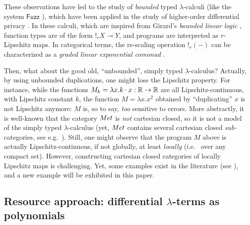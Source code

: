 These observations have led to the study of \emph{bounded} typed $\lambda$-calculi (like the system $\mathsf{Fuzz}$ \cite{Reed_2010}),
which have been applied in the study of higher-order differential privacy \cite{}. In these calculi, which are inspired from Girard's \emph{bounded linear logic} \cite{}, function types are of the form $!_{r}X \multimap Y$, and programs are interpreted as $r$-Lipschitz maps. In categorical terms, the re-scaling operation $!_{r}(-)$ can be characterized as a  \emph{graded linear exponential comonad} \cite{}. 

Then, what about the good old, ``unbounded'', simply typed $\lambda$-calculus? Actually, by using unbounded duplications, one might lose the Lipschitz property. For instance, while the functions $M_{k}=\lambda x. k\cdot x: \mathbb{R}\to \mathbb{R}$ are all Lipschitz-continuous, with Lipschitz constant $k$, the function $M=\lambda x.x^{2}$ obtained by ``duplicating'' $x$ is not Lipschitz anymore: $M$ is, so to say, \emph{too} sensitive to errors. 
More abstractly, it is well-known that the category $\Met$ is \emph{not} cartesian closed, so it is not a model of the simply typed $\lambda$-calculus (yet, $\Met$ contains several cartesian closed \emph{sub-}categories, see e.g.~\cite{}).
Still, one might observe that the program $M$ above is actually Lipschitz-continuous, if not globally, at least \emph{locally} (i.e.~ over any compact set). However, constructing cartesian closed categories of locally Lipschitz maps is challenging. Yet, some examples exist in the literature (see \cite{EhrhardPCOHdiff, PistoneLICS2021}), and a new example will be exhibited in this paper.

%
%

\subsection{Resource approach: differential $\lambda$-terms as polynomials}

